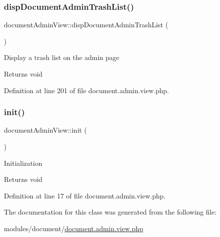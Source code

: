 \subsubsection{\texorpdfstring{disp\+Document\+Admin\+Trash\+List()}{dispDocumentAdminTrashList()}}
{\footnotesize\ttfamily document\+Admin\+View\+::disp\+Document\+Admin\+Trash\+List (\begin{DoxyParamCaption}{ }\end{DoxyParamCaption})}

Display a trash list on the admin page \begin{DoxyReturn}{Returns}
void 
\end{DoxyReturn}


Definition at line 201 of file document.\+admin.\+view.\+php.

\hypertarget{classdocumentAdminView_aed09978af62e856f18f80e8573968c3c}{}\label{classdocumentAdminView_aed09978af62e856f18f80e8573968c3c} 
\subsubsection{\texorpdfstring{init()}{init()}}
{\footnotesize\ttfamily document\+Admin\+View\+::init (\begin{DoxyParamCaption}{ }\end{DoxyParamCaption})}

Initialization \begin{DoxyReturn}{Returns}
void 
\end{DoxyReturn}


Definition at line 17 of file document.\+admin.\+view.\+php.



The documentation for this class was generated from the following file\+:\begin{DoxyCompactItemize}
\item 
modules/document/\hyperlink{document_8admin_8view_8php}{document.\+admin.\+view.\+php}\end{DoxyCompactItemize}
